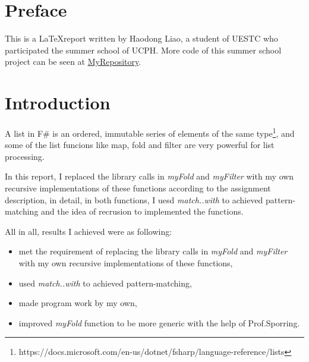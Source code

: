 \documentclass[sigconf]{acmart}
\begin{document}



\maketitle
\section{Preface}

This is a \LaTeX report written by Haodong Liao, a student of UESTC who participated the summer school of UCPH. More code of this summer school project can be seen at \href{https://github.com/Medill-East/ComputerScience/tree/master/Professional%20Core%20Courses/Functional%20Programming/SummerSchool}{MyRepository}.

\section{Introduction}

A list in F\# is an ordered, immutable series of elements of the same type\footnote[1]{https://docs.microsoft.com/en-us/dotnet/fsharp/language-reference/lists}, and some of the list funcions like map, fold and filter are very powerful for list processing. 

In this report, I replaced the library calls in \emph{myFold} and \emph{myFilter} with my own recursive implementations of these functions according to the assignment description, in detail, in both functions, I uesd \emph{match..with} to achieved pattern-matching and the idea of recrusion to implemented the functions.

All in all, results I achieved were as following:

\begin{itemize}
\item met the requirement of replacing the library calls in \emph{myFold} and \emph{myFilter} with my own recursive implementations of these functions,
\item used \emph{match..with} to achieved pattern-matching,
\item made program work by my own,
\item improved \emph{myFold} function to be more generic with the help of Prof.Sporring.
\end{itemize}
\end{document}
